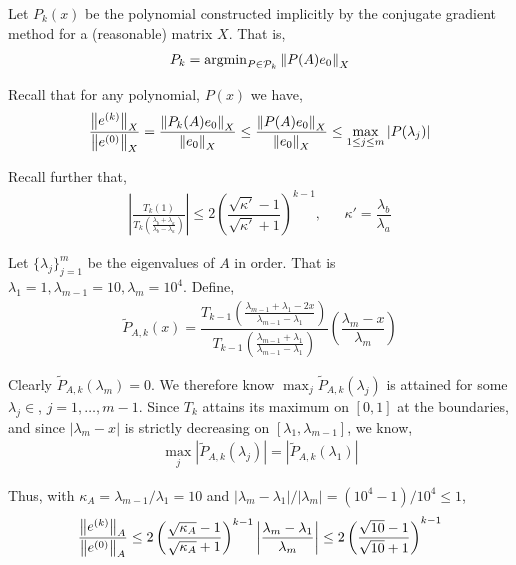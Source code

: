 \documentclass[10pt]{article}
\begin{document}
\begin{solution}[Solution]

Let \( P_k(x) \) be the polynomial constructed implicitly by the conjugate gradient method for a (reasonable) matrix \( X \). That is, 
\begin{align*}
    P_k = \operatorname{argmin}_{P\in \mathcal{P} _k} \left\lVert P(A)e_0\right\rVert_X
\end{align*}

Recall that for any polynomial, \( P(x) \) we have,
\begin{align*}
    \dfrac{\left\lVert e^{(k)}\right\rVert_X}{\left\lVert e^{(0)}\right\rVert_X}  
    = \dfrac{\left\lVert P_k(A)e_0\right\rVert_X}{\left\lVert e_0\right\rVert_X} 
    \leq \dfrac{\left\lVert P(A)e_0\right\rVert_X}{\left\lVert e_0\right\rVert_X} 
    \leq \max_{1\leq j\leq m} |P(\lambda_j)|    
\end{align*}

Recall further that,
\begin{align*}
    \left|  \frac{T_{k}(1)}{T_{k} \left( \frac{\lambda_{b}+\lambda_a}{\lambda_{b} - \lambda_a} \right)}  \right| \leq 2 \left( \dfrac{\sqrt{\kappa'}-1}{\sqrt{\kappa'}+1} \right)^{k-1}, && \kappa' = \dfrac{\lambda_{b}}{\lambda_a}
\end{align*}

Let \( \{\lambda_j\}_{j=1}^{m} \) be the eigenvalues of \( A \) in order. That is \( \lambda_1 = 1, \lambda_{m-1} = 10, \lambda_m = 10^4 \).
Define,
\begin{align*}
    \tilde{P}_{A,k}(x) = \dfrac{T_{k-1} \left( \frac{\lambda_{m-1}+\lambda_1-2x}{\lambda_{m-1}-\lambda_1} \right)}{T_{k-1} \left( \frac{\lambda_{m-1}+\lambda_1}{\lambda_{m-1} - \lambda_1} \right)} \left( \dfrac{\lambda_m-x}{\lambda_m} \right)
\end{align*}

Clearly \( \tilde{P}_{A,k}(\lambda_m) = 0 \). We therefore know \( \max_{j}\tilde{P}_{A,k}(\lambda_j) \) is attained for some \( \lambda_j \in \), \( j=1,\ldots, m-1 \). Since \( T_k \) attains its maximum on \( [0,1] \) at the boundaries, and since \( |\lambda_m-x| \) is strictly decreasing on \( [\lambda_1,\lambda_{m-1}] \), we know,
\begin{align*}
    \max_j |\tilde{P}_{A,k} (\lambda_j) | = | \tilde{P}_{A,k} (\lambda_{1}) | 
\end{align*}

Thus, with \( \kappa_A = \lambda_{m-1} / \lambda_1 = 10 \) and \( |\lambda_m-\lambda_1|/|\lambda_m| = (10^4-1)/10^4 \leq 1 \),
\begin{align*}
    \dfrac{\left\lVert e^{(k)}\right\rVert_A}{\left\lVert e^{(0)}\right\rVert_A} 
    \leq 2 \left( \dfrac{\sqrt{\kappa_A}-1}{\sqrt{\kappa_A}+1} \right)^{k-1} \left| \dfrac{\lambda_m-\lambda_{1}}{\lambda_m} \right|
    \leq 2 \left( \dfrac{\sqrt{10}-1}{\sqrt{10}+1} \right)^{k-1}
\end{align*}


\end{solution}
\end{document}

